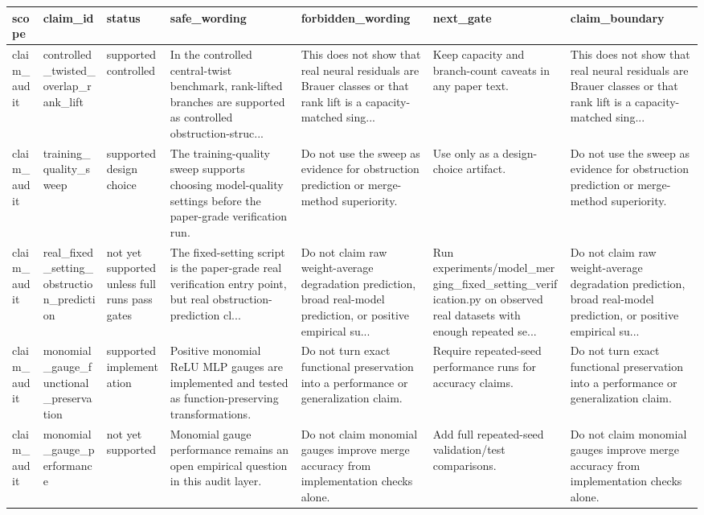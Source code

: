 \begin{tabular}{lllllll}
\toprule
scope & claim\_id & status & safe\_wording & forbidden\_wording & next\_gate & claim\_boundary \\
\midrule
claim\_audit & controlled\_twisted\_overlap\_rank\_lift & supported controlled & In the controlled central-twist benchmark, rank-lifted branches are supported as controlled obstruction-struc... & This does not show that real neural residuals are Brauer classes or that rank lift is a capacity-matched sing... & Keep capacity and branch-count caveats in any paper text. & This does not show that real neural residuals are Brauer classes or that rank lift is a capacity-matched sing... \\
claim\_audit & training\_quality\_sweep & supported design choice & The training-quality sweep supports choosing model-quality settings before the paper-grade verification run. & Do not use the sweep as evidence for obstruction prediction or merge-method superiority. & Use only as a design-choice artifact. & Do not use the sweep as evidence for obstruction prediction or merge-method superiority. \\
claim\_audit & real\_fixed\_setting\_obstruction\_prediction & not yet supported unless full runs pass gates & The fixed-setting script is the paper-grade real verification entry point, but real obstruction-prediction cl... & Do not claim raw weight-average degradation prediction, broad real-model prediction, or positive empirical su... & Run experiments/model\_merging\_fixed\_setting\_verification.py on observed real datasets with enough repeated se... & Do not claim raw weight-average degradation prediction, broad real-model prediction, or positive empirical su... \\
claim\_audit & monomial\_gauge\_functional\_preservation & supported implementation & Positive monomial ReLU MLP gauges are implemented and tested as function-preserving transformations. & Do not turn exact functional preservation into a performance or generalization claim. & Require repeated-seed performance runs for accuracy claims. & Do not turn exact functional preservation into a performance or generalization claim. \\
claim\_audit & monomial\_gauge\_performance & not yet supported & Monomial gauge performance remains an open empirical question in this audit layer. & Do not claim monomial gauges improve merge accuracy from implementation checks alone. & Add full repeated-seed validation/test comparisons. & Do not claim monomial gauges improve merge accuracy from implementation checks alone. \\

\end{tabular}
